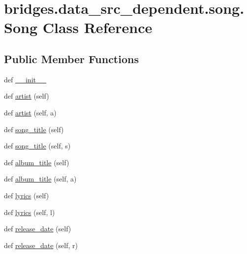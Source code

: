 \hypertarget{classbridges_1_1data__src__dependent_1_1song_1_1_song}{}\section{bridges.\+data\+\_\+src\+\_\+dependent.\+song.\+Song Class Reference}
\label{classbridges_1_1data__src__dependent_1_1song_1_1_song}
\subsection*{Public Member Functions}
\begin{DoxyCompactItemize}
\item 
def \mbox{\hyperlink{classbridges_1_1data__src__dependent_1_1song_1_1_song_a7f7384595782d5a3a829aa9f96a92845}{\+\_\+\+\_\+init\+\_\+\+\_\+}}
\item 
def \mbox{\hyperlink{classbridges_1_1data__src__dependent_1_1song_1_1_song_a82ffeb5ab815a4e5028f113e8eb2a482}{artist}} (self)
\item 
def \mbox{\hyperlink{classbridges_1_1data__src__dependent_1_1song_1_1_song_a918ecca7107f6af77f5b15d2bee5ea98}{artist}} (self, a)
\item 
def \mbox{\hyperlink{classbridges_1_1data__src__dependent_1_1song_1_1_song_a1c34d8af79451417060ee5d1e860e31e}{song\+\_\+title}} (self)
\item 
def \mbox{\hyperlink{classbridges_1_1data__src__dependent_1_1song_1_1_song_aa1f51734629030528f5bc86a6b2478f1}{song\+\_\+title}} (self, s)
\item 
def \mbox{\hyperlink{classbridges_1_1data__src__dependent_1_1song_1_1_song_a5ecb8e966ffd3659875ed3b751ed294c}{album\+\_\+title}} (self)
\item 
def \mbox{\hyperlink{classbridges_1_1data__src__dependent_1_1song_1_1_song_a62f0c444ecc16f3d87cfd0b3e0d60b52}{album\+\_\+title}} (self, a)
\item 
def \mbox{\hyperlink{classbridges_1_1data__src__dependent_1_1song_1_1_song_a9f7ec8dec6e40fbac228631b23e1734c}{lyrics}} (self)
\item 
def \mbox{\hyperlink{classbridges_1_1data__src__dependent_1_1song_1_1_song_ab88a7122f8d962728e25fa0152dd8542}{lyrics}} (self, l)
\item 
def \mbox{\hyperlink{classbridges_1_1data__src__dependent_1_1song_1_1_song_af69707705b6d4fbba2884ca3a21343a4}{release\+\_\+date}} (self)
\item 
def \mbox{\hyperlink{classbridges_1_1data__src__dependent_1_1song_1_1_song_a213d73d84e0703204841567dcc2723f3}{release\+\_\+date}} (self, r)
\end{DoxyCompactItemize}


